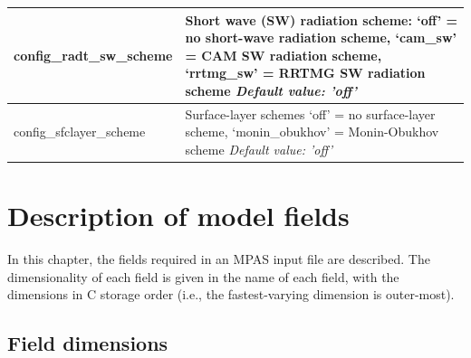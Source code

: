 \documentclass[11pt]{report}
\begin{document}
{\begin{longtable}{|p{2.0in} |p{4.25in}|}
  config\_radt\_sw\_scheme & Short wave (SW) radiation scheme: \newline
                                             `off' = no short-wave radiation scheme, \newline
                                             `cam\_sw' = CAM SW radiation scheme, \newline
                                             `rrtmg\_sw' = RRTMG SW radiation scheme \newline                                                                                           
  {\em Default value: 'off'} \\ \hline

  config\_sfclayer\_scheme &  Surface-layer schemes \newline
                                             `off' = no surface-layer scheme, \newline
                                             `monin\_obukhov' = Monin-Obukhov scheme \newline                                              
  {\em Default value: 'off'} \\ \hline
\end{longtable}
}



\chapter{Description of model fields}

In this chapter, the fields required in an MPAS input file are described. The dimensionality of each field is given in the name
of each field, with the dimensions in C storage order (i.e., the fastest-varying dimension is outer-most).

\section{Field dimensions}
\end{document}
